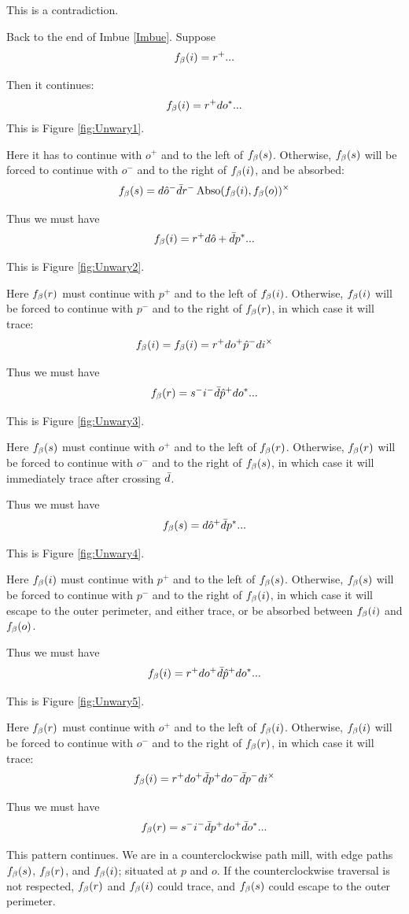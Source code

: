 This is a contradiction.

\label{Unwary}
Back to the end of Imbue \ref{Imbue}. Suppose
\[
f_\beta(i) = r^+...
\]

Then it continues:
\[
f_\beta(i) = r^+ d o^*...
\]
This is Figure \ref{fig:Unwary1}.

Here it has to continue with $o^+$ and to the left of $f_\beta(s)$. Otherwise, $f_\beta(s)$ will be forced to continue with $o^-$ and to the right of $f_\beta(i)$, and be absorbed:
\[
f_\beta(s) = d \hat{o}^- \bar{d} r^- \operatorname{Abso}(f_\beta(i), f_\beta(o))^\times
\]

Thus we must have
\[
f_\beta(i) = r^+ d \hat{o}+ \bar{d} p^*...
\]

This is Figure \ref{fig:Unwary2}.

Here $f_\beta(r)$ must continue with $p^+$ and to the left of $f_\beta(i)$. Otherwise, $f_\beta(i)$ will be forced to continue with $p^-$ and to the right of $f_\beta(r)$, in which case it will trace:
\[
f_\beta(i) = f_\beta(i) = r^+ d o^+ \hat{p}^- d i^\times
\]

Thus we must have
\[
f_\beta(r) = s^- i^- \bar{d} \hat{p}^+ d o^*...
\]

This is Figure \ref{fig:Unwary3}.

Here $f_\beta(s)$ must continue with $o^+$ and to the left of $f_\beta(r)$. Otherwise, $f_\beta(r)$ will be forced to continue with $o^-$ and to the right of $f_\beta(s)$, in which case it will immediately trace after crossing $\bar{d}$.

Thus we must have
\[
f_\beta(s) = d \hat{o}^+ \bar{d} p^*...
\]

This is Figure \ref{fig:Unwary4}.

Here $f_\beta(i)$ must continue with $p^+$ and to the left of $f_\beta(s)$. Otherwise, $f_\beta(s)$ will be forced to continue with $p^-$ and to the right of $f_\beta(i)$, in which case it will escape to the outer perimeter, and either trace, or be absorbed between $f_\beta(i)$ and $f_\beta(o)$.

Thus we must have
\[
f_\beta(i) = r^+ d o^+ \bar{d} \hat{p}^+ d o^*...
\]

This is Figure \ref{fig:Unwary5}.

Here $f_\beta(r)$ must continue with $o^+$ and to the left of $f_\beta(i)$. Otherwise, $f_\beta(i)$ will be forced to continue with $o^-$ and to the right of $f_\beta(r)$, in which case it will trace:
\[
f_\beta(i) = r^+ d o^+ \bar{d} p^+ d o^- \bar{d} p^- d i^\times
\]

Thus we must have
\[
f_\beta(r) = s^- i^- \bar{d} p^+ d o^+ \bar{d} o^*...
\]

This pattern continues. We are in a counterclockwise path mill, with edge paths $f_\beta(s)$, $f_\beta(r)$, and $f_\beta(i)$; situated at $p$ and $o$. If the counterclockwise traversal is not respected, $f_\beta(r)$ and $f_\beta(i)$ could trace, and $f_\beta(s)$ could escape to the outer perimeter.


